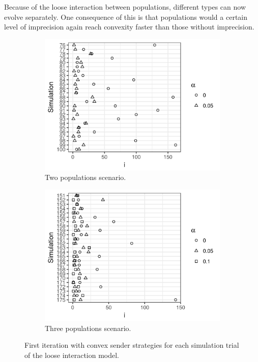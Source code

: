 \documentclass[a4paper]{article}
\begin{document}
Because of the loose interaction between populations, different types can now evolve separately.
One consequence of this is that populations would a certain level of imprecision again reach convexity faster than those without imprecision.
\begin{figure}
  \centering
  \begin{subfigure}[]{0.45\textwidth}
    \includegraphics[width=\textwidth]{simulation/results/round-3/plots/convex-cases-0-005-weakest.png}
    \caption{Two populations scenario.}
    \label{fig:convex-cases-two-loose-interaction}
  \end{subfigure}
  \hfill
  \begin{subfigure}[]{0.45\textwidth}
    \includegraphics[width=\textwidth]{simulation/results/round-3/plots/convex-cases-0-005-01-weakest.png}
    \caption{Three populations scenario.}
    \label{fig:convex-cases-three-loose-interaction}
  \end{subfigure}
  \caption{First iteration with convex sender strategies for each simulation trial of the loose interaction model.}
  \label{fig:convex-cases-loose-interaction}
\end{figure}
\end{document}

